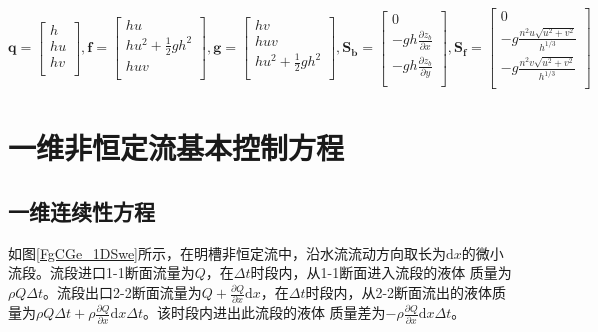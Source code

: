 \begin{equation}
  \mathbf{q} =
  \begin{bmatrix}
    h \\
    hu \\
    hv \\
  \end{bmatrix}
  ,
  \mathbf{f} =
  \begin{bmatrix}
    hu \\
    hu^{2} + \frac{1}{2}gh^{2} \\
    huv \\
  \end{bmatrix}
  ,
  \mathbf{g} =
  \begin{bmatrix}
    hv \\
    huv \\
    hu^{2} + \frac{1}{2}gh^{2} \\
  \end{bmatrix}
  ,
  \mathbf{S_{b}} =
  \begin{bmatrix}
    0 \\
    -gh\frac{\partial z_{b}}{\partial x} \\
    -gh\frac{\partial z_{b}}{\partial y} \\
  \end{bmatrix}
  ,
  \mathbf{S_{f}} =
  \begin{bmatrix}
    0 \\
    -g\frac{n^{2}u\sqrt{u^2+v^2}}{h^{1/3}} \\
    -g\frac{n^{2}v\sqrt{u^2+v^2}}{h^{1/3}} \\
  \end{bmatrix}
\end{equation}


\section{一维非恒定流基本控制方程}
\subsection{一维连续性方程}
如图\ref{FgCGe_1DSwe}所示，在明槽非恒定流中，沿水流流动方向取长为$\mathrm{d}x$的微小
流段。流段进口1-1断面流量为$Q$，在$\Delta t$时段内，从1-1断面进入流段的液体
质量为$\rho Q\Delta t$。流段出口2-2断面流量为$Q+\frac{\partial Q}{\partial
x}\mathrm{d}x$，在$\Delta t$时段内，从2-2断面流出的液体质量为$\rho Q\Delta
t+\rho\frac{\partial Q}{\partial x}\mathrm{d}x\Delta t$。该时段内进出此流段的液体
质量差为$-\rho\frac{\partial Q}{\partial x}\mathrm{d}x\Delta t$。


